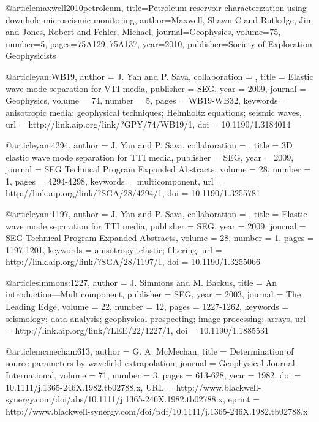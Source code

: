 @article{maxwell2010petroleum,
  title={Petroleum reservoir characterization using downhole microseismic monitoring},
  author={Maxwell, Shawn C and Rutledge, Jim and Jones, Robert and Fehler, Michael},
  journal={Geophysics},
  volume={75},
  number={5},
  pages={75A129--75A137},
  year={2010},
  publisher={Society of Exploration Geophysicists}
}








@article{yan:WB19,
author = {J. Yan and P. Sava},
collaboration = {},
title = {Elastic wave-mode separation for {VTI} media},
publisher = {SEG},
year = {2009},
journal = {Geophysics},
volume = {74},
number = {5},
pages = {WB19-WB32},
keywords = {anisotropic media; geophysical techniques; Helmholtz equations; seismic waves},
url = {http://link.aip.org/link/?GPY/74/WB19/1},
doi = {10.1190/1.3184014}
}




@article{yan:4294,
author = {J. Yan and P. Sava},
collaboration = {},
title = {3{D} elastic wave mode separation for {TTI} media},
publisher = {SEG},
year = {2009},
journal = {SEG Technical Program Expanded Abstracts},
volume = {28},
number = {1},
pages = {4294-4298},
keywords = {multicomponent},
url = {http://link.aip.org/link/?SGA/28/4294/1},
doi = {10.1190/1.3255781}
}







@article{yan:1197,
author = {J. Yan and P. Sava},
collaboration = {},
title = {Elastic wave mode separation for {TTI} media},
publisher = {SEG},
year = {2009},
journal = {SEG Technical Program Expanded Abstracts},
volume = {28},
number = {1},
pages = {1197-1201},
keywords = {anisotropy; elastic; filtering},
url = {http://link.aip.org/link/?SGA/28/1197/1},
doi = {10.1190/1.3255066}
}






@article{simmons:1227,
  author =	 {J. Simmons and M. Backus},
  title =	 {An introduction---{M}ulticomponent},
  publisher =	 {SEG},
  year =	 2003,
  journal =	 {The Leading Edge},
  volume =	 22,
  number =	 12,
  pages =	 {1227-1262},
  keywords =	 {seismology; data analysis; geophysical prospecting;
                  image processing; arrays},
  url =		 {http://link.aip.org/link/?LEE/22/1227/1},
  doi =		 {10.1190/1.1885531}
}

@article{mcmechan:613,
  author =	 {G. A. McMechan},
  title =	 {Determination of source parameters by wavefield
                  extrapolation},
  journal =	 {Geophysical Journal International},
  volume =	 71,
  number =	 3,
  pages =	 {613-628},
  year =	 1982,
  doi =		 {10.1111/j.1365-246X.1982.tb02788.x},
  URL =
                  {http://www.blackwell-synergy.com/doi/abs/10.1111/j.1365-246X.1982.tb02788.x},
  eprint =
                  {http://www.blackwell-synergy.com/doi/pdf/10.1111/j.1365-246X.1982.tb02788.x}
}


